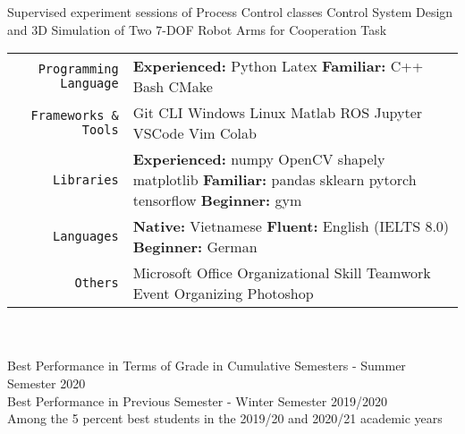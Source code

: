\documentclass[
10pt, A4, english,
draft = false,
twoside = false,
]{article}
\begin{document}
	{Supervised experiment sessions of Process Control classes}
	{Control System Design and 3D Simulation of Two 7-DOF Robot Arms for Cooperation Task}
	\tab \begin{tabular}{r p{}}
		\texttt{\large Programming Language} & \textbf{Experienced:} Python \cvContactSep Latex \tab \textbf{Familiar:} C++ \cvContactSep Bash \cvContactSep CMake\\
		\texttt{\large Frameworks \& Tools} & Git \cvContactSep CLI \cvContactSep Windows \cvContactSep Linux \cvContactSep Matlab \cvContactSep ROS \cvContactSep Jupyter \cvContactSep VSCode \cvContactSep Vim \cvContactSep Colab\\
		\texttt{\large Libraries} & \textbf{Experienced:} numpy \cvContactSep OpenCV \cvContactSep shapely \cvContactSep matplotlib \newline \textbf{Familiar:} pandas \cvContactSep sklearn \cvContactSep pytorch \cvContactSep tensorflow \tab \textbf{Beginner:} gym\\
		\texttt{\large Languages} & \textbf{Native:} Vietnamese \cvContactSep \textbf{Fluent:} English (IELTS 8.0) \cvContactSep \textbf{Beginner:} German \\
		\texttt{\large Others} & Microsoft Office \cvContactSep Organizational Skill \cvContactSep Teamwork \cvContactSep Event Organizing \cvContactSep Photoshop
	\end{tabular}\\~\\
	{Best Performance in Terms of Grade in Cumulative Semesters - Summer Semester 2020\\
		Best Performance in Previous Semester - Winter Semester 2019/2020}\\
	{Among the 5 percent best students in the 2019/20 and 2020/21 academic years}
	
\end{document}
